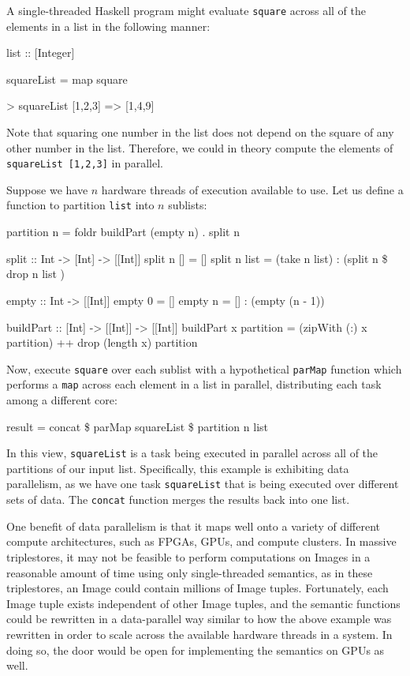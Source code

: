 \documentclass[../main.tex]{subfiles}
\begin{document}
A single-threaded Haskell program might evaluate \texttt{square} across all of the elements in a list in the following manner:

\begin{code}
	list :: [Integer]
	
	squareList = map square
	
	> squareList [1,2,3] => [1,4,9]
\end{code}

Note that squaring one number in the list does not depend on the square of any other number in the list.
Therefore, we could in theory compute the elements of \texttt{squareList [1,2,3]} in parallel.

Suppose we have $n$ hardware threads of execution available to use.  Let us define a function to partition \texttt{list} into $n$ sublists:

\begin{code}
	partition n = foldr buildPart (empty n) . split n
	
	split :: Int -> [Int] -> [[Int]]
	split n [] = []
	split n list = (take n list) : (split n \$ drop n list )
	
	empty :: Int -> [[Int]]
	empty 0 = []
	empty n = [] : (empty (n - 1))
	
	buildPart :: [Int] -> [[Int]] -> [[Int]]
	buildPart x partition = (zipWith (:) x partition) ++ drop (length x) partition
	
\end{code}

Now, execute \texttt{square} over each sublist with a hypothetical \texttt{parMap} function which
performs a \texttt{map} across each element in a list in parallel, distributing each task among a different core:

\begin{code}
	result = concat \$ parMap squareList \$ partition n list
\end{code}

In this view, \texttt{squareList} is a task being executed in parallel across all of the partitions of our input list.
Specifically, this example is exhibiting data parallelism, as we have one task \texttt{squareList} that is being executed
over different sets of data.  The \texttt{concat} function merges the results back into one list.

One benefit of data parallelism is that it maps well onto a variety of different compute architectures, such as
FPGAs, GPUs, and compute clusters.  In massive triplestores, it may not be feasible to perform computations on
Images in a reasonable amount of time using only single-threaded semantics, as in these triplestores,
an Image could contain millions of Image tuples.  Fortunately, each Image tuple exists independent of other Image tuples, and 
the semantic functions could be rewritten in a data-parallel way similar to how the above example was rewritten
in order to scale across the available hardware threads in a system.  In doing so, the door would be open for implementing
the semantics on GPUs as well.
\end{document}
